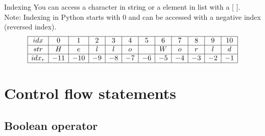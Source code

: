\documentclass[aspectratio=43]{beamer}
\begin{document}
\begin{frame}{}
    \begin{block}{Indexing}
        You can access a character in string or a element in list with a [ ]. \\
        Note: Indexing in Python starts with 0 and can be accessed with a negative index (reversed index).
        \[
            \begin{array}{|c|c|c|c|c|c|c|c|c|c|c|c|c|}
                \hline
                idx     & 0   & 1   & 2  & 3  & 4  & 5  & 6  & 7  & 8  & 9  & 10 \\
                \hline
                str     & H   & e   & l  & l  & o  & \  & W  & o  & r  & l  & d  \\
                \hline
                idx_{r} & -11 & -10 & -9 & -8 & -7 & -6 & -5 & -4 & -3 & -2 & -1 \\
                \hline
            \end{array}
        \]
        

    \end{block}
\end{frame}

\section[Control flow]{Control flow statements }
\subsection[Boolean operator]{Boolean operator}
\end{document}

